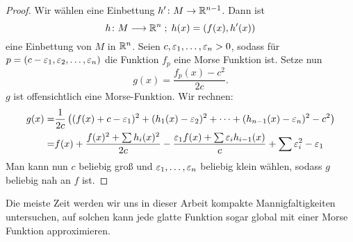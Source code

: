 \begin{proof}
    Wir wählen eine Einbettung $h' \colon M \to { \mathbb R }^{n - 1}$. Dann ist 
    \[ h \colon M \longrightarrow { \mathbb R }^n \; ; \; h(x) = (f(x), h'(x)) \]
    eine Einbettung von $M$ in ${ \mathbb R }^n$. Seien $c, \varepsilon_1, \dots, \varepsilon_n > 0$, sodass für \\
    $p = (c - \varepsilon_1, \varepsilon_2, \dots, \varepsilon_n)$ die Funktion $f_p$ eine Morse Funktion ist.
    Setze nun 
    \[ g(x) = \frac{f_p(x) - c^2}{2c} . \]
    $g$ ist offensichtlich eine Morse-Funktion. Wir rechnen:
    \begin{align*}
        g(x) = & \frac{1}{2c} \left( (f(x) + c - \varepsilon_1)^2 + (h_1(x) - \varepsilon_2)^2 
            + \dots + (h_{n-1}(x) - \varepsilon_n)^2 - c^2 \right) \\
        = & f(x) + \frac{f(x)^2 + \sum h_i(x)^2}{2c} - \frac{\varepsilon_1 f(x) 
            + \sum \varepsilon_i h_{i - 1}(x)}{c} + \sum \varepsilon_i^2 - \varepsilon_1
    \end{align*}
    Man kann nun $c$ beliebig groß und $\varepsilon_1, \dots, \varepsilon_n$ beliebig klein wählen,
    sodass $g$ beliebig nah an $f$ ist.
\end{proof}

Die meiste Zeit werden wir uns in dieser Arbeit kompakte Mannigfaltigkeiten untersuchen,
auf solchen kann jede glatte Funktion sogar global mit einer Morse Funktion approximieren.
